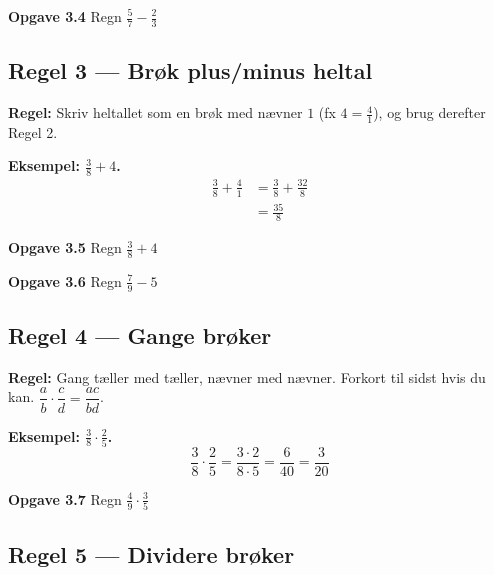 \documentclass[11pt,a4paper]{article}
\begin{document}
\begin{opgavebox}
\textbf{Opgave 3.4} \quad Regn $\tfrac{5}{7} - \tfrac{2}{3}$
\end{opgavebox}

\subsection*{Regel 3 --- Brøk plus/minus heltal}

\begin{regelbox}
\textbf{Regel:} Skriv heltallet som en brøk med nævner $1$ (fx
$4 = \tfrac{4}{1}$), og brug derefter Regel 2.
\end{regelbox}

\textbf{Eksempel: $\tfrac{3}{8} + 4$.}
\begin{align*}
  \frac{3}{8} + \frac{4}{1} &= \frac{3}{8} + \frac{32}{8}\\[2pt]
  &= \frac{35}{8}
\end{align*}

\begin{opgavebox}
\textbf{Opgave 3.5} \quad Regn $\tfrac{3}{8} + 4$
\end{opgavebox}

\begin{opgavebox}
\textbf{Opgave 3.6} \quad Regn $\tfrac{7}{9} - 5$
\end{opgavebox}

\subsection*{Regel 4 --- Gange brøker}

\begin{regelbox}
\textbf{Regel:} Gang tæller med tæller, nævner med nævner. Forkort til
sidst hvis du kan. $\dfrac{a}{b}\cdot\dfrac{c}{d} = \dfrac{ac}{bd}$.
\end{regelbox}

\textbf{Eksempel: $\tfrac{3}{8}\cdot\tfrac{2}{5}$.}
\[
  \frac{3}{8}\cdot\frac{2}{5} = \frac{3\cdot 2}{8\cdot 5} = \frac{6}{40} = \frac{3}{20}
\]

\begin{opgavebox}
\textbf{Opgave 3.7} \quad Regn $\tfrac{4}{9}\cdot\tfrac{3}{5}$
\end{opgavebox}

\subsection*{Regel 5 --- Dividere brøker}
\end{document}
